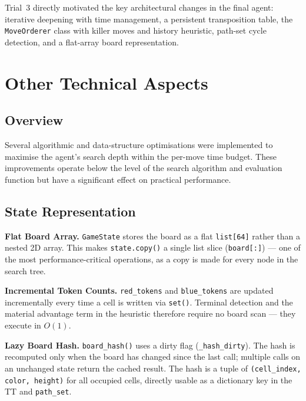 \documentclass[10pt,a4paper]{article}
\begin{document}
Trial~3 directly motivated the key architectural changes in the final agent: iterative deepening with time management, a persistent transposition table, the \texttt{MoveOrderer} class with killer moves and history heuristic, path-set cycle detection, and a flat-array board representation.

\section{Other Technical Aspects}
\label{sec:technical}

\subsection{Overview}

Several algorithmic and data-structure optimisations were implemented to maximise the agent's search depth within the per-move time budget. These improvements operate below the level of the search algorithm and evaluation function but have a significant effect on practical performance.

\subsection{State Representation}

\textbf{Flat Board Array.}
\texttt{GameState} stores the board as a flat \texttt{list[64]} rather than a nested 2D array. This makes \texttt{state.copy()} a single list slice (\texttt{board[:]}) --- one of the most performance-critical operations, as a copy is made for every node in the search tree.

\textbf{Incremental Token Counts.}
\texttt{red\_tokens} and \texttt{blue\_tokens} are updated incrementally every time a cell is written via \texttt{set()}. Terminal detection and the material advantage term in the heuristic therefore require no board scan --- they execute in $O(1)$.

\textbf{Lazy Board Hash.}
\texttt{board\_hash()} uses a dirty flag (\texttt{\_hash\_dirty}). The hash is recomputed only when the board has changed since the last call; multiple calls on an unchanged state return the cached result. The hash is a tuple of \texttt{(cell\_index, color, height)} for all occupied cells, directly usable as a dictionary key in the TT and \texttt{path\_set}.
\end{document}
